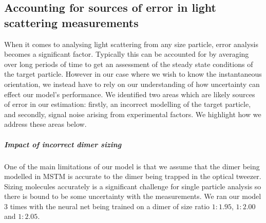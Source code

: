 \documentclass[final,  3p]{elsarticle}
\begin{document}
\subsection{Accounting for sources of error in light scattering measurements}
When it comes to analysing light scattering from any size particle, error analysis becomes a significant factor. Typically this can be accounted for by averaging over long periods of time to get an assessment of the steady state conditions of the target particle. However in our case where we wish to know the instantaneous orientation, we instead have to rely on our understanding of how uncertainty can effect our model's performance. We identified two areas which are likely sources of error in our estimation: firstly, an incorrect modelling of the target particle, and secondly, signal noise arising from experimental factors. We highlight how we address these areas below. 
\subparagraph{Impact of incorrect dimer sizing}
\label{sec:lam}

One of the main limitations of our model is that we assume that the dimer being modelled in MSTM is accurate to the dimer being trapped in the optical tweezer. Sizing molecules accurately is a significant challenge for single particle analysis so there is bound to be some uncertainty with the measurements. We ran our model 3 times with the neural net being trained on a dimer of size ratio $1:1.95$, $1:2.00$ and $1:2.05$.
\end{document}
